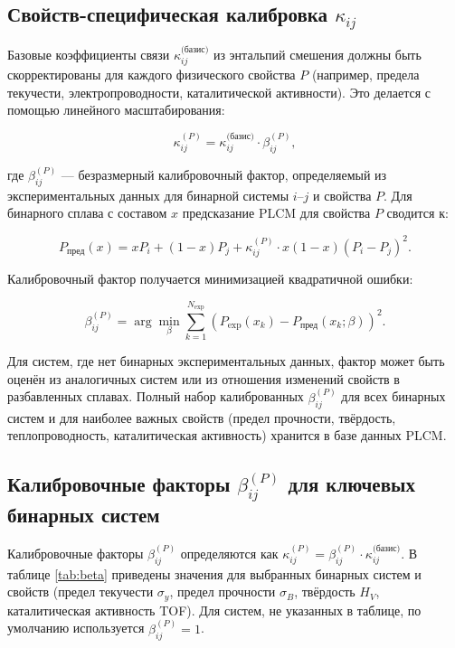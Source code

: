 \documentclass[12pt,a4paper]{article}
\begin{document}
	\subsection{Свойств-специфическая калибровка \(\kappa_{ij}\)}
	\label{subsec:property-calibration}
	
	Базовые коэффициенты связи \(\kappa_{ij}^{\text{(базис)}}\) из энтальпий смешения должны быть скорректированы для каждого физического свойства \(P\) (например, предела текучести, электропроводности, каталитической активности). Это делается с помощью линейного масштабирования:
	
	\begin{equation}
		\kappa_{ij}^{(P)} = \kappa_{ij}^{\text{(базис)}} \cdot \beta_{ij}^{(P)},
		\label{eq:kappa-calibration}
	\end{equation}
	
	где \(\beta_{ij}^{(P)}\) — безразмерный калибровочный фактор, определяемый из экспериментальных данных для бинарной системы \(i\)–\(j\) и свойства \(P\). Для бинарного сплава с составом \(x\) предсказание PLCM для свойства \(P\) сводится к:
	
	\begin{equation}
		P_{\text{пред}}(x) = x P_i + (1-x) P_j + \kappa_{ij}^{(P)} \cdot x(1-x) (P_i - P_j)^2.
		\label{eq:binary-prediction}
	\end{equation}
	
	Калибровочный фактор получается минимизацией квадратичной ошибки:
	
	\begin{equation}
		\beta_{ij}^{(P)} = \arg\min_{\beta} \sum_{k=1}^{N_{\text{exp}}} \left( P_{\text{exp}}(x_k) - P_{\text{пред}}(x_k;\beta) \right)^2.
		\label{eq:beta-optimization}
	\end{equation}
	
	Для систем, где нет бинарных экспериментальных данных, фактор может быть оценён из аналогичных систем или из отношения изменений свойств в разбавленных сплавах. Полный набор калиброванных \(\beta_{ij}^{(P)}\) для всех бинарных систем и для наиболее важных свойств (предел прочности, твёрдость, теплопроводность, каталитическая активность) хранится в базе данных PLCM.
	
	\subsection{Калибровочные факторы \(\beta_{ij}^{(P)}\) для ключевых бинарных систем}
	\label{subsec:beta-table}
	
	Калибровочные факторы \(\beta_{ij}^{(P)}\) определяются как \(\kappa_{ij}^{(P)} = \beta_{ij}^{(P)} \cdot \kappa_{ij}^{\text{(базис)}}\). В таблице \ref{tab:beta} приведены значения для выбранных бинарных систем и свойств (предел текучести \(\sigma_y\), предел прочности \(\sigma_B\), твёрдость \(H_V\), каталитическая активность TOF). Для систем, не указанных в таблице, по умолчанию используется \(\beta_{ij}^{(P)} = 1\).
	
\end{document}
